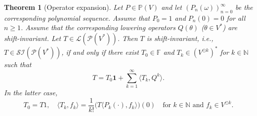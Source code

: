 \documentclass[12pt]{article}
\newtheorem{theorem}{Theorem}[section]
\theoremstyle{remark}
\theoremstyle{remark}
\theoremstyle{remark}
\begin{document}
\begin{theorem}[Operator expansion]\label{bgnfm758} Let $P\in\mathbb P(V)$ and let $(P_n(\omega))_{n=0}^\infty$ be the corresponding polynomial sequence. Assume that 
  $P_0=1$ and $P_n (0)=0$ for all $n\geq 1$.    Assume that the corresponding lowering operators $Q(\theta)$  ($\theta\in V^*$) are shift-invariant. Let $T \in \mathcal L(\mathcal P  (V^*))$. Then $T$ is shift-invariant, i.e., $T\in\mathcal{SI}(\mathcal P  (V^*))$, if and only if there exist $T_0\in \mathbb F$ and $T_k\in (V^{\odot  k})^*$ for $k\in \mathbb N$ such that
\begin{equation}\label{vgxds5ese5}T=T_0\mathbf 1+\sum_{k=1}^\infty \langle T_k,
Q^{k}\rangle .\end{equation}
In the latter case,  
\begin{equation}\label{gxes5seasew}T_0=T 1,\quad \langle 
T_k, f_k \rangle =\frac1{k!}\big(T\langle P_k(\cdot),f_k\rangle\big)(0)\quad\text{for $k\in\mathbb N$ and $f_k\in V^{\odot   k}$}.
\end{equation} 
\end{theorem}
\end{document}
